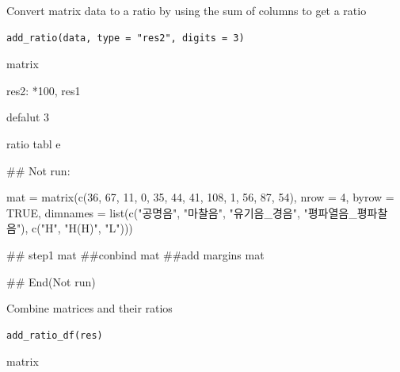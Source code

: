 \documentclass[a4paper]{book}
\begin{document}
%
\begin{Description}
Convert matrix data to a ratio by using the sum of columns to get a ratio
\end{Description}
%
\begin{Usage}
\begin{verbatim}
add_ratio(data, type = "res2", digits = 3)
\end{verbatim}
\end{Usage}
%
\begin{Arguments}
\begin{ldescription}
\item[\code{data}] matrix

\item[\code{type}] res2: *100, res1

\item[\code{digits}] defalut 3
\end{ldescription}
\end{Arguments}
%
\begin{Value}
ratio tabl e
\end{Value}
%
\begin{Examples}
\begin{ExampleCode}

\#\# Not run: 


mat = matrix(c(36, 67, 11,
          0, 35, 44,
         41, 108, 1,
          56, 87, 54),
           nrow = 4, byrow = TRUE,
 dimnames = list(c("공명음", "마찰음",
                   "유기음_경음", "평파열음_평파찰음"),
                    c("H", "H(H)", "L")))

## step1
  mat %
##conbind
 mat %
##add margins
 mat %


## End(Not run)

\end{ExampleCode}
\end{Examples}
%
\begin{Description}
Combine matrices and their ratios
\end{Description}
%
\begin{Usage}
\begin{verbatim}
add_ratio_df(res)
\end{verbatim}
\end{Usage}
%
\begin{Arguments}
\begin{ldescription}
\item[\code{res}] matrix
\end{ldescription}
\end{Arguments}
\end{document}
